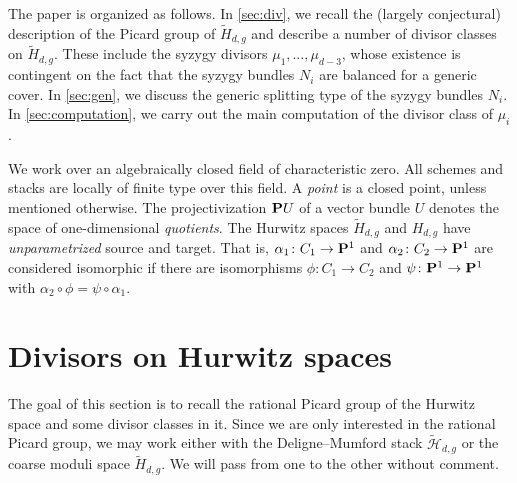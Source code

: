 \documentclass{amsart}
\newcommand{\orb}{\mathcal}
\renewcommand {\P}{{\bf P}}
\providecommand {\from}{{\colon}}
\numberwithin{equation}{section}
\begin{document}
The paper is organized as follows.
In \autoref{sec:div}, we recall the (largely conjectural) description of the Picard group of $\widetilde H_{d,g}$ and describe a number of divisor classes on $\widetilde H_{d,g}$.
These include the syzygy divisors $\mu_1, \dots, \mu_{d-3}$, whose existence is contingent on the fact that the syzygy bundles $N_i$ are balanced for a generic cover.
In \autoref{sec:gen}, we discuss the generic splitting type of the syzygy bundles $N_i$.
In \autoref{sec:computation}, we carry out the main computation of the divisor class of $\mu_i$.

We work over an algebraically closed field of characteristic zero.
All schemes and stacks are locally of finite type over this field.
A \emph{point} is a closed point, unless mentioned otherwise.
The projectivization $\P U$ of a vector bundle $U$ denotes the space of one-dimensional \emph{quotients}.
The Hurwitz spaces $\widetilde H_{d,g}$ and $H_{d,g}$ have \emph{unparametrized} source and target.
That is, $\alpha_1 \from C_1 \to \P^1$ and $\alpha_2 \from C_2 \to \P^1$ are considered isomorphic if there are isomorphisms $\phi \from C_1 \to C_2$ and $\psi \from \P^1 \to \P^1$ with $\alpha_2 \circ \phi = \psi \circ \alpha_1$.

\section{Divisors on Hurwitz spaces}\label{sec:div}
The goal of this section is to recall the rational Picard group of the Hurwitz space and some divisor classes in it.
Since we are only interested in the rational Picard group, we may work either with the Deligne--Mumford stack $\widetilde{\orb H}_{d,g}$ or the coarse moduli space $\widetilde H_{d,g}$.
We will pass from one to the other without comment.
\end{document}
